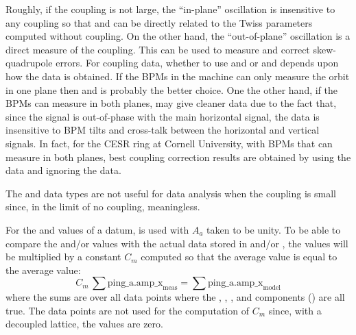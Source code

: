\begin{description}
{{{{{{Roughly, if the coupling is not large, the ``in-plane''  oscillation is insensitive to any
coupling so that  and  can be directly related to the
Twiss parameters computed without coupling. On the other hand, the ``out-of-plane'' 
oscillation is a direct measure of the coupling. This can be used to measure and correct
skew-quadrupole errors. For coupling data, whether to use  and
 or  and  depends upon how
the data is obtained. If the BPMs in the machine can only measure the orbit in one plane then
 and  is probably the better choice. One the other hand,
if the BPMs can measure in both planes,  may give cleaner data due to the
fact that, since the  signal is out-of-phase with the main horizontal
signal, the  data is insensitive to BPM tilts and cross-talk between the
horizontal and vertical signals. In fact, for the CESR ring at Cornell University, with BPMs that
can measure in both planes, best coupling correction results are obtained by using the
 data and ignoring the  data.

The  and  data types are not useful for data analysis when the
coupling is small since, in the limit of no coupling,  meaningless.

For the  and  values of a datum,  is used with $A_a$ taken
to be unity. To be able to compare the  and/or  values with the
actual data stored in  and/or , the  values will be multiplied by a
constant $C_m$ computed so that the average  value is equal to the average
 value:
\begin{equation}
  C_m \, \sum \text{ping_a.amp_x}_\text{meas} = \sum \text{ping_a.amp_x}_\text{model}
\end{equation}
where the sums are over all  data points where the ,
, , and  components () are
all true. The  data points are not used for the computation of $C_m$
since, with a decoupled lattice, the  values are zero.

}}}}}}
\end{description}
